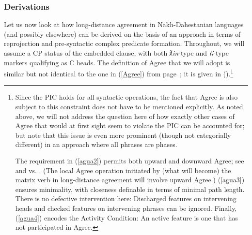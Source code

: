 \documentclass[output=paper
,modfonts
,nonflat]{langsci/langscibook}
\begin{document}
	\subsubsection{Derivations}
	
	Let us now look at how long-distance agreement in Nakh-Dahestanian
	languages (and possibly elsewhere) can be derived on the basis of an
	approach in terms of reprojection and pre-syntactic complex predicate
	formation. Throughout, we will assume a CP status of the embedded
	clause, with both  {\itshape ƛin}-type and {\itshape {\l}i}-type
	markers qualifying as C heads. The definition of Agree that we will
	adopt is similar but not identical to the one in (\ref{Agree}) from page~\pageref{Agree}; it
	is given in (\Next).\footnote{Since the PIC holds for all syntactic
		operations, the fact that Agree is also subject to this constraint
		does not have to be mentioned explicitly. As noted above, we will
		not address the question here of how exactly other cases of Agree that
		would at first sight seem to violate the PIC can be accounted for;
		but note that this issue is even more prominent (though not
		categorially different) in an approach where all phrases are
		phases. 
		
		The requirement in (\ref{agua2}) permits both upward and downward Agree; see
		\citet{Zeijlstra:12} and \citet{BjorkmanZeijlstra:14} vs. \citet{Preminger:13:tha}.
		(The local Agree operation initiated by (what will become) the matrix verb in
		long-distance agreement will involve upward Agree.) (\ref{agua3})
		ensures minimality, with closeness definable in terms of minimal path
		length. There is no defective intervention here: Discharged
		features on intervening  heads and checked features on intervening phrases can be ignored. Finally,
		(\ref{agua4}) encodes the Activity Condition: An active feature is one
		that has not participated in Agree.}
\end{document}
